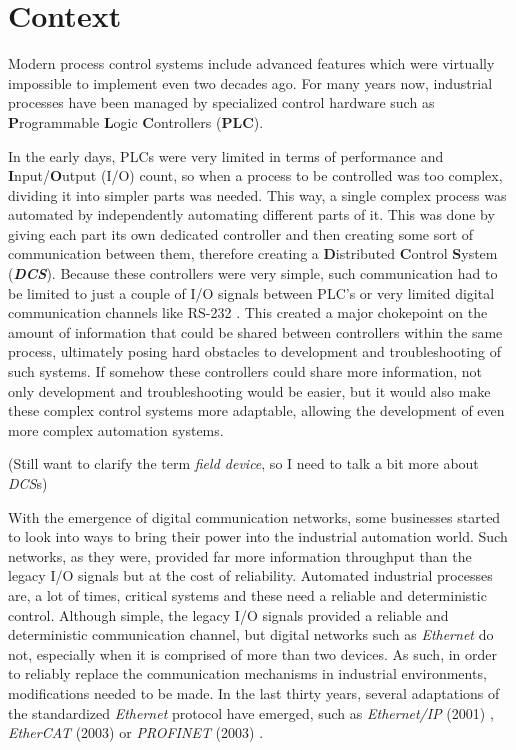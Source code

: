 \section{Context} \label{sec:context}

Modern process control systems include advanced features which were virtually impossible to implement even two decades ago. For many years now, industrial processes have been managed by specialized control hardware such as \textbf Programmable \textbf Logic \textbf Controllers ({\bfseries PLC}).

In the early days, PLCs were very limited in terms of performance and \textbf Input/\textbf Output (I/O) count, so when a process to be controlled was too complex, dividing it into simpler parts was needed. This way, a single complex process was automated by independently automating different parts of it. This was done by giving each part its own dedicated controller and then creating some sort of communication between them, therefore creating a \textbf Distributed \textbf Control \textbf System ({\bfseries\itshape DCS}). Because these controllers were very simple, such communication had to be limited to just a couple of I/O signals between PLC's or very limited digital communication channels like RS-232 \cite{protocol:rs232}. This created a major chokepoint on the amount of information that could be shared between controllers within the same process, ultimately posing hard obstacles to development and troubleshooting of such systems. If somehow these controllers could share more information, not only development and troubleshooting would be easier, but it would also make these complex control systems more adaptable, allowing the development of even more complex automation systems.

(Still want to clarify the term \emph{field device}, so I need to talk a bit more about \emph{DCS}s)

With the emergence of digital communication networks, some businesses started to look into ways to bring their power into the industrial automation world. Such networks, as they were, provided far more information throughput than the legacy I/O signals but at the cost of reliability. Automated industrial processes are, a lot of times, critical systems and these need a reliable and deterministic control. Although simple, the legacy I/O signals provided a reliable and deterministic communication channel, but digital networks such as \emph{Ethernet} \cite{protocol:ethernet} do not, especially when it is comprised of more than two devices. As such, in order to reliably replace the communication mechanisms in industrial environments, modifications needed to be made. In the last thirty years, several adaptations of the standardized \emph{Ethernet} protocol have emerged, such as \emph{Ethernet/IP} (2001) \cite{protocol:ethernetip}, \emph{EtherCAT} (2003) \cite{protocol:ethercat} or \emph{PROFINET} (2003) \cite{protocol:profinet}.

